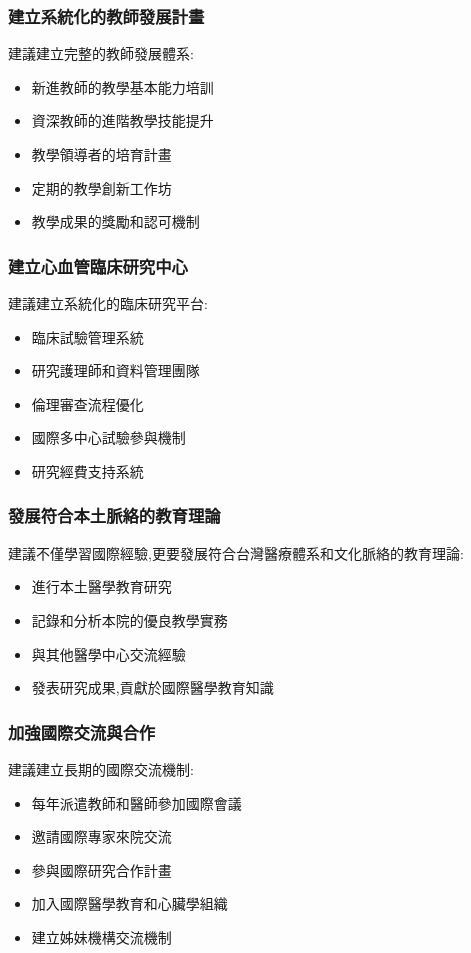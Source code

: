 \documentclass[12pt,a4paper]{article}
\begin{document}
\subsubsection{建立系統化的教師發展計畫}

建議建立完整的教師發展體系:
\begin{itemize}[nosep]
    \item 新進教師的教學基本能力培訓
    \item 資深教師的進階教學技能提升
    \item 教學領導者的培育計畫
    \item 定期的教學創新工作坊
    \item 教學成果的獎勵和認可機制
\end{itemize}

\subsubsection{建立心血管臨床研究中心}

建議建立系統化的臨床研究平台:
\begin{itemize}[nosep]
    \item 臨床試驗管理系統
    \item 研究護理師和資料管理團隊
    \item 倫理審查流程優化
    \item 國際多中心試驗參與機制
    \item 研究經費支持系統
\end{itemize}

\subsubsection{發展符合本土脈絡的教育理論}

建議不僅學習國際經驗,更要發展符合台灣醫療體系和文化脈絡的教育理論:
\begin{itemize}[nosep]
    \item 進行本土醫學教育研究
    \item 記錄和分析本院的優良教學實務
    \item 與其他醫學中心交流經驗
    \item 發表研究成果,貢獻於國際醫學教育知識
\end{itemize}

\subsubsection{加強國際交流與合作}

建議建立長期的國際交流機制:
\begin{itemize}[nosep]
    \item 每年派遣教師和醫師參加國際會議
    \item 邀請國際專家來院交流
    \item 參與國際研究合作計畫
    \item 加入國際醫學教育和心臟學組織
    \item 建立姊妹機構交流機制
\end{itemize}
\end{document}
